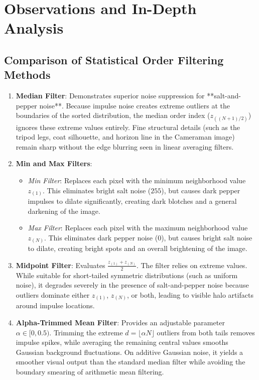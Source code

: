 \documentclass[12pt]{article}
\begin{document}
\section{Observations and In-Depth Analysis}

\subsection{Comparison of Statistical Order Filtering Methods}
\begin{enumerate}
    \item \textbf{Median Filter}:
    Demonstrates superior noise suppression for **salt-and-pepper noise**. Because impulse noise creates extreme outliers at the boundaries of the sorted distribution, the median order index ($z_{((N+1)/2)}$) ignores these extreme values entirely. Fine structural details (such as the tripod legs, coat silhouette, and horizon line in the Cameraman image) remain sharp without the edge blurring seen in linear averaging filters.

    \item \textbf{Min and Max Filters}:
    \begin{itemize}
        \item \textit{Min Filter}: Replaces each pixel with the minimum neighborhood value $z_{(1)}$. This eliminates bright salt noise ($255$), but causes dark pepper impulses to dilate significantly, creating dark blotches and a general darkening of the image.
        \item \textit{Max Filter}: Replaces each pixel with the maximum neighborhood value $z_{(N)}$. This eliminates dark pepper noise ($0$), but causes bright salt noise to dilate, creating bright spots and an overall brightening of the image.
    \end{itemize}

    \item \textbf{Midpoint Filter}:
    Evaluates $\frac{z_{(1)} + z_{(N)}}{2}$. The filter relies on extreme values. While suitable for short-tailed symmetric distributions (such as uniform noise), it degrades severely in the presence of salt-and-pepper noise because outliers dominate either $z_{(1)}$, $z_{(N)}$, or both, leading to visible halo artifacts around impulse locations.

    \item \textbf{Alpha-Trimmed Mean Filter}:
    Provides an adjustable parameter $\alpha \in [0, 0.5)$. Trimming the extreme $d = \lfloor \alpha N \rfloor$ outliers from both tails removes impulse spikes, while averaging the remaining central values smooths Gaussian background fluctuations. On additive Gaussian noise, it yields a smoother visual output than the standard median filter while avoiding the boundary smearing of arithmetic mean filtering.


\end{enumerate}
\end{document}
